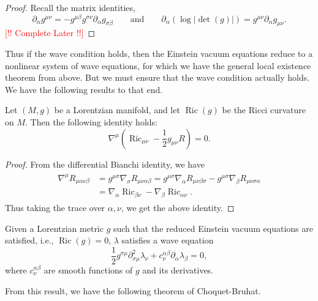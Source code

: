 \documentclass{article}
\begin{document}
\begin{proof}
	Recall the matrix identities, 
	\begin{equation*}
		\partial_{\alpha}g^{\mu\nu} = -g^{\mu\beta}g^{\sigma\nu}\partial_{\alpha}g_{\sigma\beta} \qquad \text{and} \qquad \partial_{\alpha}(\log|\det(g)|) = g^{\mu\nu}\partial_{\alpha}g_{\mu\nu}. 
	\end{equation*} 
	\textcolor{red}{[!! Complete Later !!]}
\end{proof} 
Thus if the wave condition holds, then the Einstein vacuum equations reduce to a nonlinear system of wave equations, for which we have the general local existence theorem from above. But we must ensure that the wave condition actually holds. We have the following results to that end. 

\begin{lemma}
	Let $(M, g)$ be a Lorentzian manifold, and let $\operatorname{Ric}(g)$ be the Ricci curvature on $M$. Then the following identity holds: 
	\begin{equation*}
		\nabla^{\mu}(\operatorname{Ric}_{\mu\nu} - \frac{1}{2}g_{\mu\nu}R) = 0. 
	\end{equation*} 
\end{lemma} 
\begin{proof}
	From the differential Bianchi identity, we have 
	\begin{align*}
		\begin{split}
			\nabla^{\mu}R_{\mu\alpha\nu\beta} &= g^{\mu\sigma}\nabla_{\sigma}R_{\mu\nu\alpha\beta} = g^{\mu\sigma}\nabla_{\alpha}R_{\mu\nu\beta\sigma} - g^{\mu\sigma}\nabla_{\beta}R_{\mu\nu\sigma\alpha} \\
			&= \nabla_{\alpha}\operatorname{Ric}_{\beta\nu}  - \nabla_{\beta}\operatorname{Ric}_{\alpha\nu}. 
		\end{split} 
	\end{align*} 
	Thus taking the trace over $\alpha,\nu$, we get the above identity. 
\end{proof} 
\begin{prop}
	Given a Lorentzian metric $g$ such that the reduced Einstein vacuum equations are satisfied, i.e., $\operatorname{Ric}(g) = 0$, $\lambda$ satisfies a wave equation 
	\begin{equation*}
		\frac{1}{2}g^{\sigma\mu}\partial_{\sigma\mu}^{2}\lambda_{\nu} + c_{\nu}^{\alpha\beta}\partial_{\alpha}\lambda_{\beta} =0, 
	\end{equation*} 
	where $c_{\nu}^{\alpha\beta}$ are smooth functions of $g$ and its derivatives. 
\end{prop} 
From this result, we have the following theorem of Choquet-Bruhat. 
\end{document}
